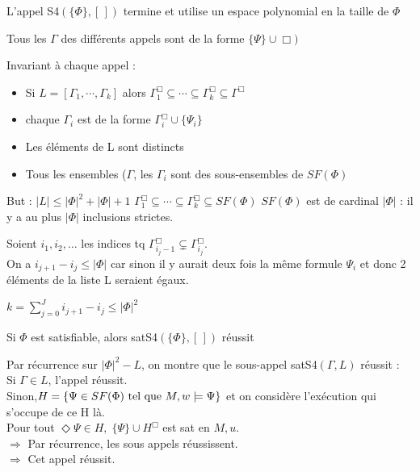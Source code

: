 \documentclass[10pt,a4paper]{article}
\begin{document}
\begin{thm}
 L'appel S4$(\{\Phi\}, [\,])$ termine et utilise un espace polynomial en la taille de $\Phi$
\end{thm}
\begin{dem}
 Tous les $\Gamma$ des différents appels sont de la forme $\{\Psi\} \cup \Box)$

Invariant à chaque appel : 
\begin{itemize}
 \item Si $L = [ \Gamma_1, \cdots, \Gamma_k]$ alors $\Gamma_1^{\Box} \subseteq \cdots \subseteq \Gamma_k^{\Box} \subseteq \Gamma^{\Box}$
 \item chaque $\Gamma_i$ est de la forme $\Gamma_i^{\Box} \cup \{\Psi_i\}$
 \item Les éléments de L sont distincts
 \item Tous les ensembles ($\Gamma$, les $\Gamma_i$ sont des sous-ensembles de $SF(\Phi)$
\end{itemize}

But : $ | L |  \leq  | \Phi | ^2 +  | \Phi |  +1$
$\Gamma_1^{\Box} \subseteq \cdots \subseteq \Gamma_k^{\Box} \subseteq  SF(\Phi)$
$SF(\Phi)$ est de cardinal $ | \Phi | $ : il y a au plus $ | \Phi | $ inclusions strictes.

Soient $i_1, i_2, \dots$ les indices tq $\Gamma_{i_j-1}^{\Box} \varsubsetneq \Gamma_{i_j}^{\Box}$.\\
On a $i_{j+1} - i_j \leq  | \Phi | $ car sinon il y aurait deux fois la même formule $\Psi_i$ et donc 2 éléments de la liste L seraient égaux.

$k = \sum^J_{j=0} i_{j+1} - i_j \leq  | \Phi | ^2$
\end{dem}

\begin{thm}
 Si $\Phi$ est satisfiable, alors satS4$(\{\Phi\}, [\,])$ réussit
\end{thm}
\begin{dem}
 Par récurrence sur $ | \Phi | ^2 - L$, on montre que le sous-appel satS4$(\Gamma, L)$ réussit :\\
Si $\Gamma \in L$, l'appel réussit.\\
Sinon,$H = \{\Psi \in SF(\Phi) \text{ tel que } M, w \models \Psi \}$ et on considère l'exécution qui s'occupe de ce H là.\\
Pour tout $\Diamond \Psi \in H, \; \{ \Psi \} \cup H^{\Box}$ est sat en $M,u$.\\
$\Rightarrow$ Par récurrence, les sous appels réussissent.\\
 $\Rightarrow$ Cet appel réussit.
\end{dem}
\end{document}
